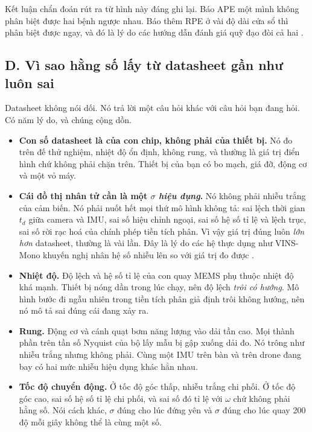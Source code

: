 \documentclass[../../deep_learning.tex]{subfiles}
\begin{document}
Kết luận chẩn đoán rút ra từ hình này đáng ghi lại. Báo APE một mình không phân biệt được hai bệnh ngược nhau. Báo thêm RPE ở vài độ dài cửa sổ thì phân biệt được ngay, và đó là lý do các hướng dẫn đánh giá quỹ đạo đòi cả hai \cite{zhang2018trajeval}.

\subsection{D. Vì sao hằng số lấy từ datasheet gần như luôn sai}

Datasheet không nói dối. Nó trả lời một câu hỏi khác với câu hỏi bạn đang hỏi. Có năm lý do, và chúng cộng dồn.

\begin{itemize}
\item \textbf{Con số datasheet là của con chip, không phải của thiết bị.} Nó đo trên đế thử nghiệm, nhiệt độ ổn định, không rung, và thường là giá trị điển hình chứ không phải chặn trên. Thiết bị của bạn có bo mạch, giá đỡ, động cơ và một vỏ máy.
\item \textbf{Cái đồ thị nhân tử cần là một \(\sigma\) \emph{hiệu dụng}.} Nó không phải nhiễu trắng của cảm biến. Nó phải nuốt hết mọi thứ mô hình không tả: sai lệch thời gian \(t_d\) giữa camera và IMU, sai số hiệu chỉnh ngoại, sai số hệ số tỉ lệ và lệch trục, sai số rời rạc hoá của chính phép tiền tích phân. Vì vậy giá trị đúng luôn \emph{lớn hơn} datasheet, thường là vài lần. Đây là lý do các hệ thực dụng như VINS-Mono khuyến nghị nhân hệ số nhiễu lên so với giá trị đo được \cite{qin2018vinsmono}.
\item \textbf{Nhiệt độ.} Độ lệch và hệ số tỉ lệ của con quay MEMS phụ thuộc nhiệt độ khá mạnh. Thiết bị nóng dần trong lúc chạy, nên độ lệch \emph{trôi có hướng}. Mô hình bước đi ngẫu nhiên trong tiền tích phân giả định trôi không hướng, nên nó mô tả sai đúng cái đang xảy ra.
\item \textbf{Rung.} Động cơ và cánh quạt bơm năng lượng vào dải tần cao. Mọi thành phần trên tần số Nyquist của bộ lấy mẫu bị gập xuống dải đo. Nó trông như nhiễu trắng nhưng không phải. Cùng một IMU trên bàn và trên drone đang bay có hai mức nhiễu hiệu dụng khác hẳn nhau.
\item \textbf{Tốc độ chuyển động.} Ở tốc độ góc thấp, nhiễu trắng chi phối. Ở tốc độ góc cao, sai số hệ số tỉ lệ chi phối, và sai số đó tỉ lệ với \(\omega\) chứ không phải hằng số. Nói cách khác, \(\sigma\) đúng cho lúc đứng yên và \(\sigma\) đúng cho lúc quay 200 độ mỗi giây không thể là cùng một số.
\end{itemize}
\end{document}
